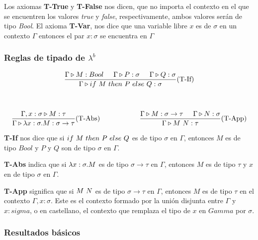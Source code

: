 \vspace*{5mm}
Los axiomas \textbf{T-True} y \textbf{T-False} nos dicen, que no importa el contexto en el que se encuentren los valores \textit{true} y \textit{false}, respectivamente, ambos valores serán de tipo \textit{Bool}. El axioma \textbf{T-Var}, nos dice que una variable libre $x$ es de $\sigma$ en un contexto $\Gamma$ entonces el par $x:\sigma$ se encuentra en $\Gamma$

\subsubsection{Reglas de tipado de \texorpdfstring{$\lambda^b$}{lambda b}}
\begin{equation*}
\begin{gathered}
\frac{\judgeType{\Gamma}{M}{Bool}\hspace*{5mm}\judgeType{\Gamma}{P}{\sigma}\hspace*{5mm}\judgeType{\Gamma}{Q}{\sigma}}{\judgeType{\Gamma}{\lambdaIf{M}{P}{Q}}{\sigma}}(\text{T-If}) \\
\vspace*{5mm} \\
\frac {\judgeType{\Gamma,x:\sigma}{M}{\tau}}
      {\judgeType{\Gamma}{\lambdaAbs{x}{\sigma}{M}}{\sigma\to\tau}}(\text{T-Abs})\hspace*{2cm}
\frac{\judgeType{\Gamma}{M}{\sigma\to\tau}\hspace*{5mm}\judgeType{\Gamma}{N}{\sigma}}{\judgeType{\Gamma}{\lambdaApp{M}{N}}{\tau}}(\text{T-App})
\end{gathered}
\end{equation*}

\vspace*{5mm}
\textbf{T-If} nos dice que si $if~ M~ then~ P~ else~ Q$ es de tipo $\sigma$ en $\Gamma$, entonces $M$ es de tipo $Bool$ y $P$ y $Q$ son de tipo $\sigma$ en $\Gamma$.

\textbf{T-Abs} indica que si $\lambda x: \sigma . M$ es de tipo $\sigma\to\tau$ en $\Gamma$, entonces $M$ es de tipo $\tau$ y $x$ en de tipo $\sigma$ en $\Gamma$.

\textbf{T-App} significa que si $M~N$ es de tipo $\sigma\to\tau$ en $\Gamma$, entonces $M$ es de tipo $\tau$ en el contexto $\Gamma, x:\sigma$. Este es el contexto formado por la unión disjunta entre $\Gamma$ y $x:sigma$, o en castellano, el contexto que remplaza el tipo de $x$ en $Gamma$ por $\sigma$.

\subsubsection{Resultados básicos}

